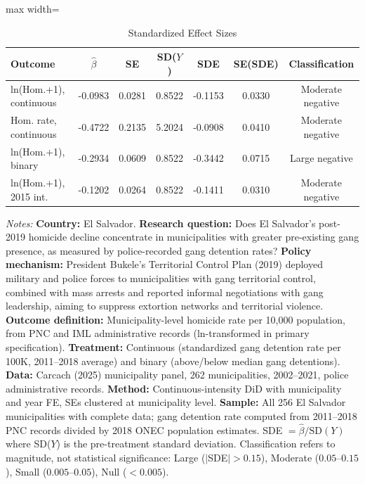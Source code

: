 \begin{table}[htbp]
\centering
\caption{Standardized Effect Sizes}
\label{tab:sde}
\begin{adjustbox}{max width=\textwidth}
\begin{tabular}{lcccccc}
\toprule
Outcome & $\hat{\beta}$ & SE & SD($Y$) & SDE & SE(SDE) & Classification \\
\midrule
ln(Hom.+1), continuous & -0.0983 & 0.0281 & 0.8522 & -0.1153 & 0.0330 & Moderate negative \\
Hom. rate, continuous & -0.4722 & 0.2135 & 5.2024 & -0.0908 & 0.0410 & Moderate negative \\
ln(Hom.+1), binary & -0.2934 & 0.0609 & 0.8522 & -0.3442 & 0.0715 & Large negative \\
ln(Hom.+1), 2015 int. & -0.1202 & 0.0264 & 0.8522 & -0.1411 & 0.0310 & Moderate negative \\
\bottomrule
\end{tabular}
\end{adjustbox}
\begin{tablenotes}[flushleft]\small
\item \textit{Notes:} \textbf{Country:} El Salvador. \textbf{Research question:} Does El Salvador's post-2019 homicide decline concentrate in municipalities with greater pre-existing gang presence, as measured by police-recorded gang detention rates? \textbf{Policy mechanism:} President Bukele's Territorial Control Plan (2019) deployed military and police forces to municipalities with gang territorial control, combined with mass arrests and reported informal negotiations with gang leadership, aiming to suppress extortion networks and territorial violence. \textbf{Outcome definition:} Municipality-level homicide rate per 10,000 population, from PNC and IML administrative records (ln-transformed in primary specification). \textbf{Treatment:} Continuous (standardized gang detention rate per 100K, 2011--2018 average) and binary (above/below median gang detentions). \textbf{Data:} Carcach (2025) municipality panel, 262 municipalities, 2002--2021, police administrative records. \textbf{Method:} Continuous-intensity DiD with municipality and year FE, SEs clustered at municipality level. \textbf{Sample:} All 256 El Salvador municipalities with complete data; gang detention rate computed from 2011--2018 PNC records divided by 2018 ONEC population estimates. SDE $= \hat{\beta} / \text{SD}(Y)$ where SD($Y$) is the pre-treatment standard deviation. Classification refers to magnitude, not statistical significance: Large ($|$SDE$| > 0.15$), Moderate ($0.05$--$0.15$), Small ($0.005$--$0.05$), Null ($< 0.005$).
\end{tablenotes}
\end{table}
